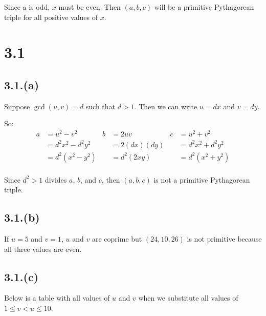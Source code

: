 \documentclass[letterpaper, 12pt]{memoir}
\theoremstyle{mystyle}
\begin{document}
Since a is odd, $x$ must be even. Then $(a,b,c)$ will be a primitive Pythagorean
triple for all positive values of $x$.

\section*{3.1}

\subsection*{3.1.(a)}
Suppose $\gcd(u,v) = d$ such that $d > 1$. Then we can write $u = dx$ and 
$v = dy$.

So:
\begin{align*}
    a &= u^2 - v^2          & b &= 2uv          & c &= u^2 + v^2\\
      &= d^2 x^2 - d^2 y^2  &   &= 2(dx)(dy)    &   &= d^2 x^2 + d^2 y^2\\
      &= d^2(x^2 - y^2)     &   &= d^2 (2xy)    &   &= d^2 (x^2 + y^2) \\
\end{align*}

Since $d^2 > 1$ divides $a$, $b$, and $c$, then $(a,b,c)$ is not a primitive
Pythagorean triple.

\subsection*{3.1.(b)}
If $u = 5$ and $v = 1$, $u$ and $v$ are coprime but $(24, 10, 26)$ is not 
primitive because all three values are even.

\subsection*{3.1.(c)}
Below is a table with all values of $u$ and $v$ when we substitute all values
of ${1 \leq v < u \leq 10}$.
\end{document}
